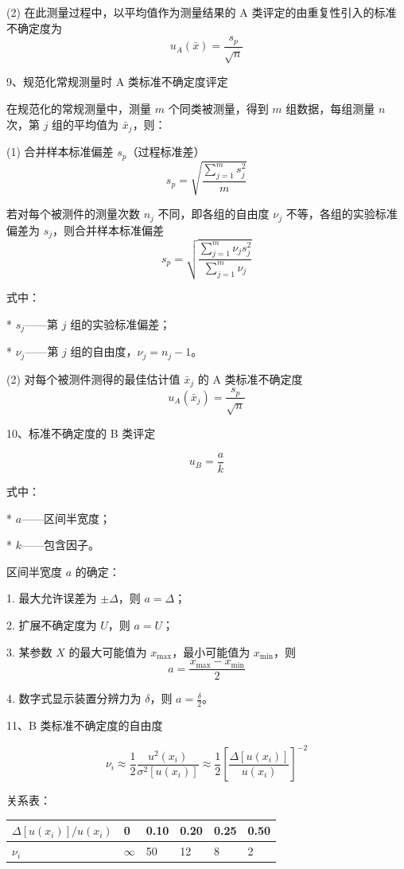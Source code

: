 \documentclass[UTF8]{ctexart}
\begin{document}
(2) 在此测量过程中，以平均值作为测量结果的 A 类评定的由重复性引入的标准不确定度为
\[
u_A(\bar{x}) = \frac{s_p}{\sqrt{n}}
\]

\vspace{5mm} 
9、规范化常规测量时 A 类标准不确定度评定

在规范化的常规测量中，测量 \(m\) 个同类被测量，得到 \(m\) 组数据，每组测量 \(n\) 次，第 \(j\) 组的平均值为 \(\bar{x}_j\)，则：

(1) 合并样本标准偏差 \(s_p\)（过程标准差）
\[
s_p = \sqrt{\frac{\sum_{j=1}^{m} s_j^2}{m}}
\]

若对每个被测件的测量次数 \(n_j\) 不同，即各组的自由度 \(\nu_j\) 不等，各组的实验标准偏差为 \(s_j\)，则合并样本标准偏差
\[
s_p = \sqrt{\frac{\sum_{j=1}^{m} \nu_j s_j^2}{\sum_{j=1}^{m} \nu_j}}
\]

式中：

*   \(s_j\)——第 \(j\) 组的实验标准偏差；

*   \(\nu_j\)——第 \(j\) 组的自由度，\(\nu_j = n_j - 1\)。

(2) 对每个被测件测得的最佳估计值 \(\bar{x}_j\) 的 A 类标准不确定度
\[
u_A(\bar{x}_j) = \frac{s_p}{\sqrt{n}}
\]

\vspace{5mm} 
10、标准不确定度的 B 类评定

\[
u_B = \frac{a}{k}
\]

式中：

*   \(a\)——区间半宽度；

*   \(k\)——包含因子。

区间半宽度 \(a\) 的确定：

1.  最大允许误差为 \(\pm \Delta\)，则 \(a = \Delta\)；

2.  扩展不确定度为 \(U\)，则 \(a = U\)；

3.  某参数 \(X\) 的最大可能值为 \(x_{\max}\)，最小可能值为 \(x_{\min}\)，则
\[
a = \frac{x_{\max} - x_{\min}}{2}
\]

4.  数字式显示装置分辨力为 \(\delta\)，则 \(a = \frac{\delta}{2}\)。

\vspace{5mm} 
11、B 类标准不确定度的自由度

\[
\nu_i \approx \frac{1}{2} \frac{u^2(x_i)}{\sigma^2[u(x_i)]} \approx \frac{1}{2} \left[ \frac{\Delta[u(x_i)]}{u(x_i)} \right]^{-2}
\]

关系表：
\begin{table}[!ht]
    \centering
    \begin{tabular}{|l|l|l|l|l|l|}
    \hline
        \(\Delta[u(x_i)]/u(x_i)\) & 0 & 0.10 & 0.20 & 0.25 & 0.50 \\ \hline
        \(\nu_i\) & \(\infty\) & 50 & 12 & 8 & 2 \\ \hline
    \end{tabular}
\end{table}
\end{document}
